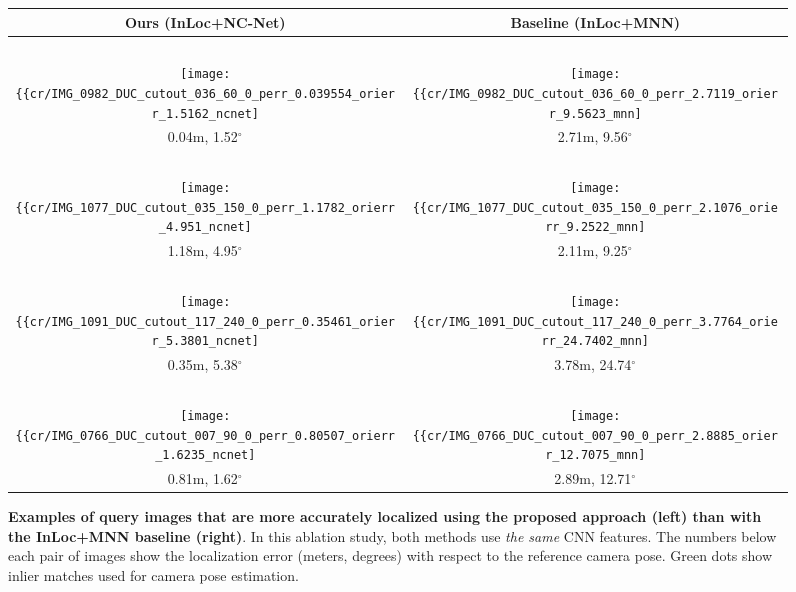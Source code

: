 \documentclass{article}
\begin{document}
\begin{figure}[tbp]
  \centering
  \begingroup
  \renewcommand{\arraystretch}{0.5}
  \begin{tabular}{@{\hskip 1pt}c@{\hskip 6pt}|@{\hskip 6pt}c@{\hskip 1pt}}
    Ours (InLoc+NC-Net) & Baseline (InLoc+MNN) \\ \hline
     ~ & ~ \\ 
    \texttt{[image: \{\{cr/IMG\_0982\_DUC\_cutout\_036\_60\_0\_perr\_0.039554\_orierr\_1.5162\_ncnet]}}} &    \texttt{[image: \{\{cr/IMG\_0982\_DUC\_cutout\_036\_60\_0\_perr\_2.7119\_orierr\_9.5623\_mnn]}}} \\
    0.04m, 1.52$^\circ$ & 2.71m, 9.56$^\circ$ \\ \hline
    ~ & ~ \\ 
    \texttt{[image: \{\{cr/IMG\_1077\_DUC\_cutout\_035\_150\_0\_perr\_1.1782\_orierr\_4.951\_ncnet]}}} &    \texttt{[image: \{\{cr/IMG\_1077\_DUC\_cutout\_035\_150\_0\_perr\_2.1076\_orierr\_9.2522\_mnn]}}} \\
    1.18m, 4.95$^\circ$ & 2.11m, 9.25$^\circ$ \\ \hline
    ~ & ~ \\ 
    \texttt{[image: \{\{cr/IMG\_1091\_DUC\_cutout\_117\_240\_0\_perr\_0.35461\_orierr\_5.3801\_ncnet]}}} &    \texttt{[image: \{\{cr/IMG\_1091\_DUC\_cutout\_117\_240\_0\_perr\_3.7764\_orierr\_24.7402\_mnn]}}} \\
    0.35m, 5.38$^\circ$ & 3.78m, 24.74$^\circ$ \\ \hline
    ~ & ~ \\ 
    \texttt{[image: \{\{cr/IMG\_0766\_DUC\_cutout\_007\_90\_0\_perr\_0.80507\_orierr\_1.6235\_ncnet]}}} &    \texttt{[image: \{\{cr/IMG\_0766\_DUC\_cutout\_007\_90\_0\_perr\_2.8885\_orierr\_12.7075\_mnn]}}} \\
    0.81m, 1.62$^\circ$ & 2.89m, 12.71$^\circ$ 
  \end{tabular}
  \endgroup
  \vspace{2pt}
  \caption{{\bf Examples of query images that are more accurately localized using the proposed approach (left) than with the InLoc+MNN baseline (right)}. In this ablation study, both methods use \emph{the same} CNN features. The numbers below each pair of images show the localization error (meters, degrees) with respect to the reference camera pose. Green dots show inlier matches used for camera pose estimation.}
  \label{fig:densePV_MNN}
\end{figure}
\end{document}

